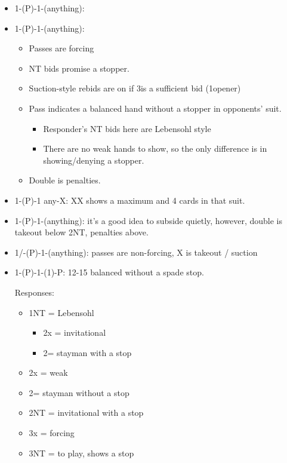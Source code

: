 \documentclass[a4paper,14pt]{extarticle}
\begin{document}
\begin{itemize}
\item 1\clubs-(P)-1\spades-(anything):
\item 1\diamonds-(P)-1\spades-(anything):
\begin{itemize}
   \item Passes are forcing
   \item NT bids promise a stopper.
   \item Suction-style rebids are on if 3\clubs is a sufficient bid (1\diamonds opener)
   \item Pass indicates a balanced hand without a stopper in opponents' suit.
	\begin{itemize}
      \item Responder's NT bids here are Lebensohl style 
      \item There are no weak hands to show, so the only difference is in showing/denying a stopper.
	\end{itemize}
   \item Double is penalties.
\end{itemize}

\item 1\clubs-(P)-1 any-X: XX shows a maximum and 4 cards in that suit.

\item 1\clubs-(P)-1\diamonds-(anything): it's a good idea to subside quietly, however, double is takeout below 2NT, penalties above.

\item 1\clubs/\diamonds-(P)-1\hearts-(anything): passes are non-forcing, X is takeout / suction

\item 1\clubs-(P)-1\hearts-(1\spades)-P: 12-15 balanced without a spade stop.

Responses:
	\begin{itemize}
	\item 1NT = Lebensohl
		\begin{itemize}
		\item 2x = invitational
		\item 2\spades = stayman with a stop
		\end{itemize}
	\item 2x = weak
	\item 2\spades = stayman without a stop
	\item 2NT = invitational with a stop
	\item 3x = forcing
	\item 3NT = to play, shows a stop
	\end{itemize}

\end{itemize}
\end{document}
